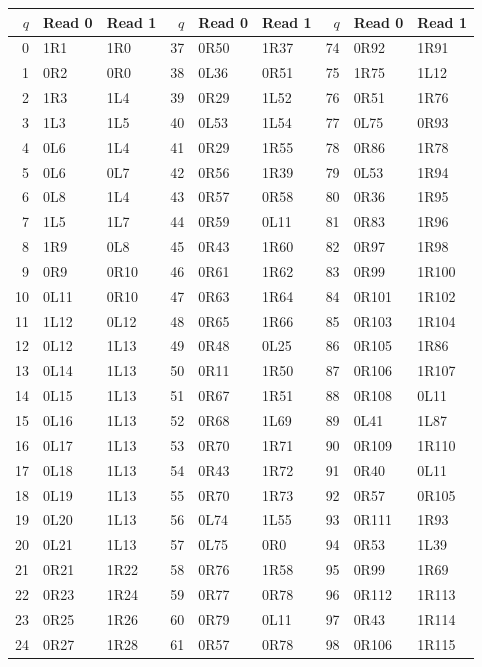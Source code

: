 \small
\begin{center}
\begin{tabular}{rll@{\qquad}rll@{\qquad}rll}
\toprule
$q$ & Read 0 & Read 1 & $q$ & Read 0 & Read 1 & $q$ & Read 0 & Read 1\\
\midrule
0 & 1R1 & 1R0 & 37 & 0R50 & 1R37 & 74 & 0R92 & 1R91\\
1 & 0R2 & 0R0 & 38 & 0L36 & 0R51 & 75 & 1R75 & 1L12\\
2 & 1R3 & 1L4 & 39 & 0R29 & 1L52 & 76 & 0R51 & 1R76\\
3 & 1L3 & 1L5 & 40 & 0L53 & 1L54 & 77 & 0L75 & 0R93\\
4 & 0L6 & 1L4 & 41 & 0R29 & 1R55 & 78 & 0R86 & 1R78\\
5 & 0L6 & 0L7 & 42 & 0R56 & 1R39 & 79 & 0L53 & 1R94\\
6 & 0L8 & 1L4 & 43 & 0R57 & 0R58 & 80 & 0R36 & 1R95\\
7 & 1L5 & 1L7 & 44 & 0R59 & 0L11 & 81 & 0R83 & 1R96\\
8 & 1R9 & 0L8 & 45 & 0R43 & 1R60 & 82 & 0R97 & 1R98\\
9 & 0R9 & 0R10 & 46 & 0R61 & 1R62 & 83 & 0R99 & 1R100\\
10 & 0L11 & 0R10 & 47 & 0R63 & 1R64 & 84 & 0R101 & 1R102\\
11 & 1L12 & 0L12 & 48 & 0R65 & 1R66 & 85 & 0R103 & 1R104\\
12 & 0L12 & 1L13 & 49 & 0R48 & 0L25 & 86 & 0R105 & 1R86\\
13 & 0L14 & 1L13 & 50 & 0R11 & 1R50 & 87 & 0R106 & 1R107\\
14 & 0L15 & 1L13 & 51 & 0R67 & 1R51 & 88 & 0R108 & 0L11\\
15 & 0L16 & 1L13 & 52 & 0R68 & 1L69 & 89 & 0L41 & 1L87\\
16 & 0L17 & 1L13 & 53 & 0R70 & 1R71 & 90 & 0R109 & 1R110\\
17 & 0L18 & 1L13 & 54 & 0R43 & 1R72 & 91 & 0R40 & 0L11\\
18 & 0L19 & 1L13 & 55 & 0R70 & 1R73 & 92 & 0R57 & 0R105\\
19 & 0L20 & 1L13 & 56 & 0L74 & 1L55 & 93 & 0R111 & 1R93\\
20 & 0L21 & 1L13 & 57 & 0L75 & 0R0 & 94 & 0R53 & 1L39\\
21 & 0R21 & 1R22 & 58 & 0R76 & 1R58 & 95 & 0R99 & 1R69\\
22 & 0R23 & 1R24 & 59 & 0R77 & 0R78 & 96 & 0R112 & 1R113\\
23 & 0R25 & 1R26 & 60 & 0R79 & 0L11 & 97 & 0R43 & 1R114\\
24 & 0R27 & 1R28 & 61 & 0R57 & 0R78 & 98 & 0R106 & 1R115\\

\end{tabular}
\end{center}
